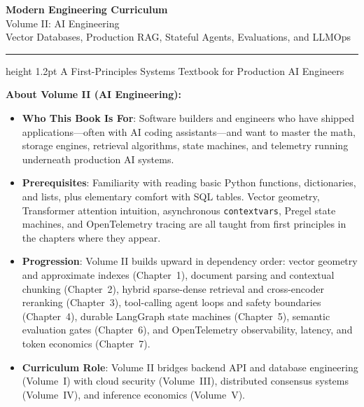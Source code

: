 \documentclass[11pt,oneside]{book}
\begin{document}
\frontmatter
\pagestyle{empty}

\begin{center}
  \vspace*{2cm}
  {\Huge\sffamily\bfseries\color{headingblue} Modern Engineering Curriculum}\\[12pt]
  {\Large\sffamily\color{gray} Volume II: AI Engineering}\\[8pt]
  {\large\sffamily\color{textdark} Vector Databases, Production RAG, Stateful Agents, Evaluations, and LLMOps}\\[30pt]
  \hrule height 1.2pt
  \vspace*{25pt}
  {\normalsize\sffamily A First-Principles Systems Textbook for Production AI Engineers}
\end{center}

\vspace{2.2cm}

\begin{tcolorbox}[
  enhanced,
  colback=white,
  colframe=gray!30!white,
  boxrule=0.8pt,
  arc=2pt,
  left=15pt,right=15pt,top=12pt,bottom=12pt
]
\sffamily\small
\textbf{About Volume II (AI Engineering):}
\begin{itemize}[leftmargin=15pt]
  \item \textbf{Who This Book Is For}: Software builders and engineers who have shipped applications---often with AI coding assistants---and want to master the math, storage engines, retrieval algorithms, state machines, and telemetry running underneath production AI systems.
  \item \textbf{Prerequisites}: Familiarity with reading basic Python functions, dictionaries, and lists, plus elementary comfort with SQL tables. Vector geometry, Transformer attention intuition, asynchronous \texttt{contextvars}, Pregel state machines, and OpenTelemetry tracing are all taught from first principles in the chapters where they appear.
  \item \textbf{Progression}: Volume II builds upward in dependency order: vector geometry and approximate indexes (Chapter~1), document parsing and contextual chunking (Chapter~2), hybrid sparse-dense retrieval and cross-encoder reranking (Chapter~3), tool-calling agent loops and safety boundaries (Chapter~4), durable LangGraph state machines (Chapter~5), semantic evaluation gates (Chapter~6), and OpenTelemetry observability, latency, and token economics (Chapter~7).
  \item \textbf{Curriculum Role}: Volume II bridges backend API and database engineering (Volume~I) with cloud security (Volume~III), distributed consensus systems (Volume~IV), and inference economics (Volume~V).
\end{itemize}
\end{tcolorbox}

\newpage
\pagestyle{fancy}
\tableofcontents
\newpage

\mainmatter








\end{document}
